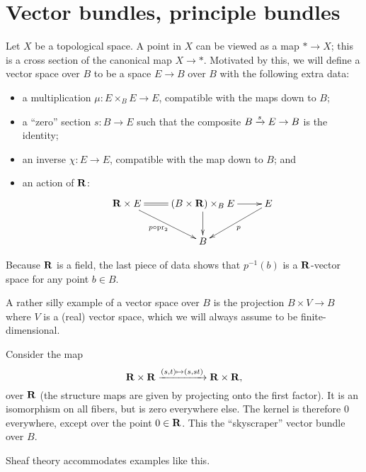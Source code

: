 \section{Vector bundles, principle bundles}
Let $X$ be a topological space. A point in $X$ can be viewed as a map $\ast\to
X$; this is a cross section of the canonical map $X\to \ast$. Motivated by
this, we will define a vector space over $B$ to be a space $E\to B$ over $B$
with the following extra data:
\begin{itemize}
    \item a multiplication $\mu:E\times_B E\to E$, compatible with the maps
	down to $B$;
    \item a ``zero'' section $s:B\to E$ such that the composite $B\xrightarrow{{s}}E\to
	B$ is the identity;
    \item an inverse $\chi:E\to E$, compatible with the map down to $B$; and
    \item an action of $\mathbf R$:
	\begin{equation*}
	    \xymatrix{
		\RR\times E\ar[dr]_{p\circ \pr_2}\ar@{=}[r] &
		(B\times\RR)\times_B E\ar[r]\ar[d] & E\ar[dl]^p\\
		& B &
	    }
	\end{equation*}
\end{itemize}
Because $\mathbf R$ is a field, the last piece of data shows that $p^{-1}(b)$ is a
$\mathbf R$-vector space for any point $b\in B$.
\begin{example}\label{trivialvectorbundle}
    A rather silly example of a vector space over $B$ is the projection
    $B\times V\to B$ where $V$ is a (real) vector space, which we will always
    assume to be finite-dimensional.
\end{example}
\begin{example}
    Consider the map
    $$\mathbf R\times\mathbf R\xrightarrow{(s,t)\mapsto(s,st)}\mathbf R\times\mathbf R,$$
    over $\mathbf R$ (the structure maps are given by projecting onto the first
    factor). It is an isomorphism on all fibers, but is zero everywhere else.
    The kernel is therefore $0$ everywhere, except over the point $0\in\mathbf R$.
    This the ``skyscraper'' vector bundle over $B$.
\end{example}
Sheaf theory accommodates examples like this.

